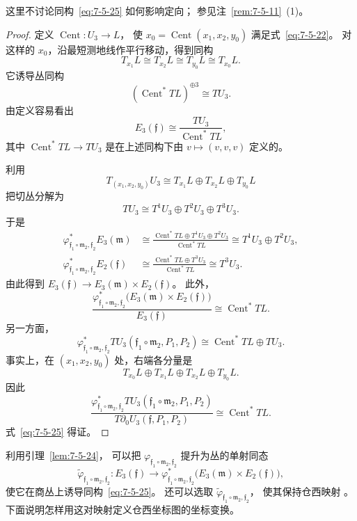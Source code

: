 这里不讨论同构~\eqref{eq:7-5-25} 如何影响定向；
参见注~\ref{rem:7-5-11}~(1)。

\begin{proof}
定义 $\operatorname{Cent}\colon U_3\to L$，
使 $x_0=\operatorname{Cent}(x_1,x_2,y_0)$
满足式~\eqref{eq:7-5-22}。
对这样的 $x_0$，沿最短测地线作平行移动，得到同构
\[
T_{x_1}L\cong T_{x_2}L\cong T_{y_0}L\cong T_{x_0}L.
\]
它诱导丛同构
\[
(\operatorname{Cent}^*TL)^{\oplus3}\cong TU_3.
\]
由定义容易看出
\[
E_3(\mathfrak f)
\cong\frac{TU_3}{\operatorname{Cent}^*TL},
\]
其中
$\operatorname{Cent}^*TL\to TU_3$
是在上述同构下由 $v\mapsto(v,v,v)$ 定义的。

利用
\[
T_{(x_1,x_2,y_0)}U_3
\cong T_{x_1}L\oplus T_{x_2}L\oplus T_{y_0}L
\]
把切丛分解为
\[
TU_3\cong T^1U_3\oplus T^2U_3\oplus T^3U_3.
\]
于是
\[
\begin{aligned}
\varphi_{\mathfrak f_1\circ\mathfrak m_2,\mathfrak f_2}^*
E_3(\mathfrak m)
&\cong
\frac{\operatorname{Cent}^*TL\oplus T^1U_3\oplus T^2U_3}
{\operatorname{Cent}^*TL}
\cong T^1U_3\oplus T^2U_3,\\
\varphi_{\mathfrak f_1\circ\mathfrak m_2,\mathfrak f_2}^*
E_2(\mathfrak f)
&\cong
\frac{\operatorname{Cent}^*TL\oplus T^3U_3}
{\operatorname{Cent}^*TL}
\cong T^3U_3.
\end{aligned}
\]
由此得到
$E_3(\mathfrak f)\to E_3(\mathfrak m)\times E_2(\mathfrak f)$。
此外，
\[
\frac{
\varphi_{\mathfrak f_1\circ\mathfrak m_2,\mathfrak f_2}^*
\bigl(E_3(\mathfrak m)\times E_2(\mathfrak f)\bigr)}
{E_3(\mathfrak f)}
\cong\operatorname{Cent}^*TL.
\]
另一方面，
\[
\varphi_{\mathfrak f_1\circ\mathfrak m_2,\mathfrak f_2}^*
T U_3(\mathfrak f_1\circ\mathfrak m_2,P_1,P_2)
\cong\operatorname{Cent}^*TL\oplus TU_3.
\]
事实上，在 $(x_1,x_2,y_0)$ 处，右端各分量是
\[
T_{x_0}L\oplus T_{x_1}L\oplus T_{x_2}L\oplus T_{y_0}L.
\]
因此
\[
\frac{
\varphi_{\mathfrak f_1\circ\mathfrak m_2,\mathfrak f_2}^*
T U_3(\mathfrak f_1\circ\mathfrak m_2,P_1,P_2)}
{T\partial_0U_3(\mathfrak f,P_1,P_2)}
\cong\operatorname{Cent}^*TL.
\]
式~\eqref{eq:7-5-25} 得证。
\end{proof}

利用引理~\ref{lem:7-5-24}，
可以把
$\varphi_{\mathfrak f_1\circ\mathfrak m_2,\mathfrak f_2}$
提升为丛的单射同态
\[
\widetilde\varphi_{\mathfrak f_1\circ\mathfrak m_2,\mathfrak f_2}
\colon E_3(\mathfrak f)
\longrightarrow
\varphi_{\mathfrak f_1\circ\mathfrak m_2,\mathfrak f_2}^*
\bigl(E_3(\mathfrak m)\times E_2(\mathfrak f)\bigr),
\]
使它在商丛上诱导同构~\eqref{eq:7-5-25}。
还可以选取
$\widetilde\varphi_{\mathfrak f_1\circ\mathfrak m_2,\mathfrak f_2}$，
使其保持仓西映射
。
下面说明怎样用这对映射定义仓西坐标图的坐标变换。

